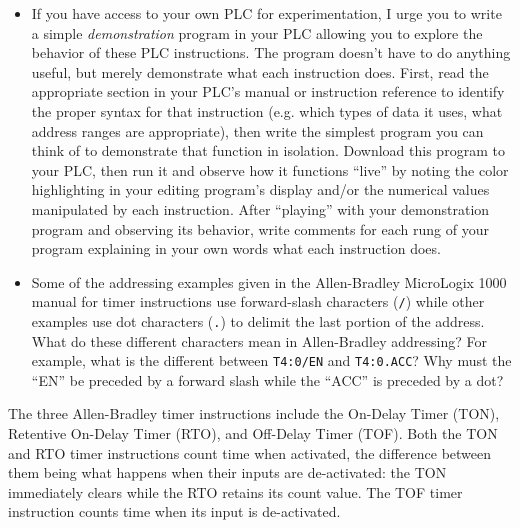 \begin{itemize}
\item{} If you have access to your own PLC for experimentation, I urge you to write a simple {\it demonstration} program in your PLC allowing you to explore the behavior of these PLC instructions.  The program doesn't have to do anything useful, but merely demonstrate what each instruction does.  First, read the appropriate section in your PLC's manual or instruction reference to identify the proper syntax for that instruction (e.g. which types of data it uses, what address ranges are appropriate), then write the simplest program you can think of to demonstrate that function in isolation.  Download this program to your PLC, then run it and observe how it functions ``live'' by noting the color highlighting in your editing program's display and/or the numerical values manipulated by each instruction.  After ``playing'' with your demonstration program and observing its behavior, write comments for each rung of your program explaining in your own words what each instruction does.
\item{} Some of the addressing examples given in the Allen-Bradley MicroLogix 1000 manual for timer instructions use forward-slash characters ({\tt /}) while other examples use dot characters ({\tt .}) to delimit the last portion of the address.  What do these different characters mean in Allen-Bradley addressing?  For example, what is the different between {\tt T4:0/EN} and {\tt T4:0.ACC}?  Why must the ``EN'' be preceded by a forward slash while the ``ACC'' is preceded by a dot?
\end{itemize}














The three Allen-Bradley timer instructions include the On-Delay Timer (TON), Retentive On-Delay Timer (RTO), and Off-Delay Timer (TOF).  Both the TON and RTO timer instructions count time when activated, the difference between them being what happens when their inputs are de-activated: the TON immediately clears while the RTO retains its count value.  The TOF timer instruction counts time when its input is de-activated.

\vskip 10pt

